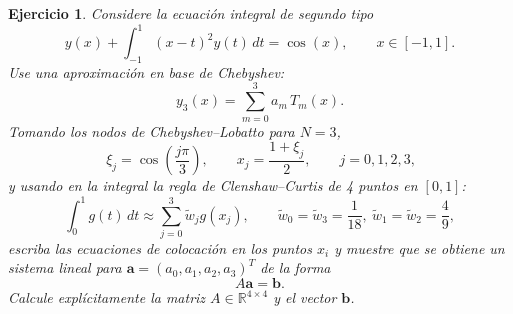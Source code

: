 \documentclass[12pt]{article}
\newtheorem{exercise}{Ejercicio}
\newcommand{\bej}{\begin{exercise}\rm}
\newcommand{\fej}{\end{exercise}}
\newcommand{\R}{\mathbb{R}}
\begin{document}
\bej Considere la ecuación integral de segundo tipo
\[
y(x)+\int_{-1}^1 (x-t)^2 y(t)\,dt=\cos(x),\qquad x\in[-1,1].
\]
Use una aproximación en base de Chebyshev:
\[
y_3(x)=\sum_{m=0}^3 a_m\,T_m(x).
\]
Tomando los nodos de Chebyshev--Lobatto para $N=3$,
\[\
\xi_j=\cos\!\left(\frac{j\pi}{3}\right),\qquad x_j=\frac{1+\xi_j}{2},\qquad j=0,1,2,3,
\]
y usando en la integral la regla de Clenshaw--Curtis de 4 puntos en $[0,1]$:
\[
\int_0^1 g(t)\,dt\approx\sum_{j=0}^3 \widetilde w_j g(x_j),
\qquad
\widetilde w_0=\widetilde w_3=\frac{1}{18},\ \widetilde w_1=\widetilde w_2=\frac{4}{9},
\]
escriba las ecuaciones de colocación en los puntos $x_i$ y muestre que se obtiene un sistema lineal para $\mathbf a=(a_0,a_1,a_2,a_3)^T$ de la forma
\[
A\mathbf a=\mathbf b.
\]
Calcule explícitamente la matriz $A\in\R^{4\times 4}$ y el vector $\mathbf b$.
\fej
\end{document}
